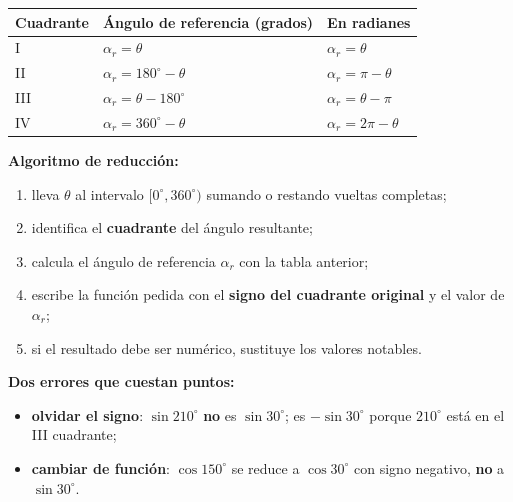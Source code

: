 \documentclass[12pt, letterpaper]{article}
\providecommand{\sen}{\sin}
\begin{document}
\begin{center}
\small
\begin{tabular}{@{}lll@{}}
  \toprule
  \textbf{Cuadrante} & \textbf{Ángulo de referencia (grados)} & \textbf{En radianes} \\
  \midrule
  I   & $\alpha_r=\theta$            & $\alpha_r=\theta$ \\
  II  & $\alpha_r=180^\circ-\theta$  & $\alpha_r=\pi-\theta$ \\
  III & $\alpha_r=\theta-180^\circ$  & $\alpha_r=\theta-\pi$ \\
  IV  & $\alpha_r=360^\circ-\theta$  & $\alpha_r=2\pi-\theta$ \\
  \bottomrule
\end{tabular}
\end{center}

\begin{cuadropasos}
  \small
  \textbf{Algoritmo de reducción:}
  \begin{enumerate}[leftmargin=1.4em, nosep]
    \item lleva $\theta$ al intervalo $[0^\circ,360^\circ)$ sumando o
          restando vueltas completas;
    \item identifica el \textbf{cuadrante} del ángulo resultante;
    \item calcula el ángulo de referencia $\alpha_r$ con la tabla anterior;
    \item escribe la función pedida con el \textbf{signo del cuadrante
          original} y el valor de $\alpha_r$;
    \item si el resultado debe ser numérico, sustituye los valores notables.
  \end{enumerate}
\end{cuadropasos}

\begin{cuadroadvertencia}
  \small
  \textbf{Dos errores que cuestan puntos:}
  \begin{itemize}[leftmargin=1.2em, nosep, topsep=2pt]
    \item \textbf{olvidar el signo}: $\sen 210^\circ$ \textbf{no} es
          $\sen 30^\circ$; es $-\sen 30^\circ$ porque $210^\circ$ está en el
          III cuadrante;
    \item \textbf{cambiar de función}: $\cos 150^\circ$ se reduce a
          $\cos 30^\circ$ con signo negativo, \textbf{no} a $\sen 30^\circ$.
  \end{itemize}
\end{cuadroadvertencia}
\end{document}
